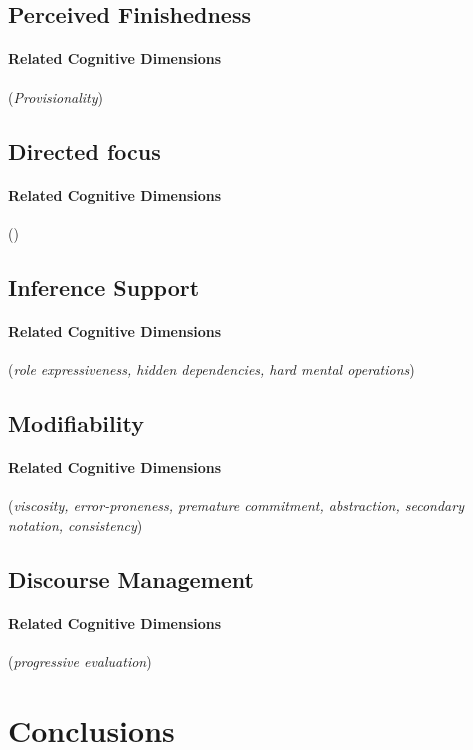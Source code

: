 \documentclass{sig-alternate}
\begin{document}
\subsection{Perceived Finishedness}
\paragraph{Related Cognitive Dimensions}
(\emph{Provisionality})

\subsection{Directed focus}
\paragraph{Related Cognitive Dimensions}
(\emph{})

\subsection{Inference Support}
\paragraph{Related Cognitive Dimensions}
(\emph{role expressiveness, hidden dependencies, hard mental operations})

\subsection{Modifiability}
\paragraph{Related Cognitive Dimensions}
(\emph{viscosity, error-proneness, premature commitment, abstraction, secondary
notation, consistency})

\subsection{Discourse Management}
\paragraph{Related Cognitive Dimensions}
(\emph{progressive evaluation})
\section{Conclusions}
  
  
  
\end{document}
